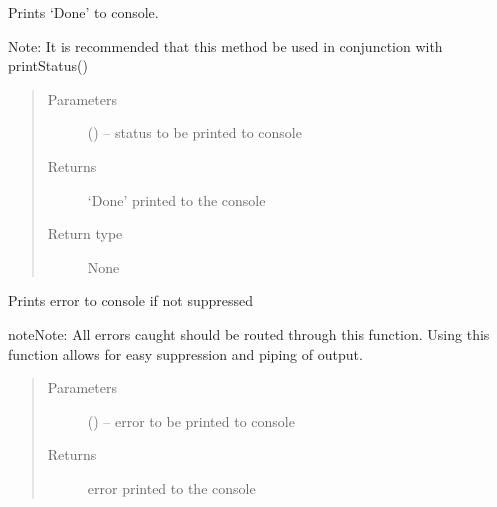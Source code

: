 \documentclass[letterpaper,10pt,english]{sphinxmanual}
\begin{document}
\begin{fulllineitems}
\begin{fulllineitems}
\begin{quote}
\begin{description}
\end{description}\end{quote}

\end{fulllineitems}


\begin{fulllineitems}
\label{\detokenize{MouseReferenceManual:Modules.Base.ModuleBaseClass.printDone}}
Prints `Done' to console.

Note:
It is recommended that this method be used in conjunction with printStatus()
\begin{quote}\begin{description}
\item[{Parameters}] \leavevmode
{} () -- status to be printed to console

\item[{Returns}] \leavevmode
`Done' printed to the console

\item[{Return type}] \leavevmode
None

\end{description}\end{quote}

\end{fulllineitems}


\begin{fulllineitems}
\label{\detokenize{MouseReferenceManual:Modules.Base.ModuleBaseClass.printErrors}}
Prints error to console if not suppressed

\begin{sphinxadmonition}{note}{Note:}
All errors caught should be routed through this function. Using this function allows for easy suppression and piping of output.
\end{sphinxadmonition}
\begin{quote}\begin{description}
\item[{Parameters}] \leavevmode
{} () -- error to be printed to console

\item[{Returns}] \leavevmode
error printed to the console


\end{description}
\end{quote}
\end{fulllineitems}
\end{fulllineitems}
\end{document}
